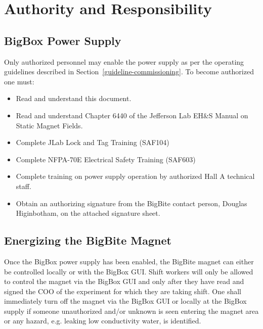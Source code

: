 \section{Authority and Responsibility}

\subsection{BigBox Power Supply}

Only authorized personnel may enable the power supply as per the operating
guidelines described in Section~\ref{guideline-commissioning}.  To become authorized one must:

\begin{itemize}

\item{Read and understand this document.}

\item{Read and understand Chapter 6440 of the Jefferson Lab EH\&S Manual on Static Magnet Fields.}

\item{Complete JLab Lock and Tag Training (SAF104)}

\item{Complete NFPA-70E Electrical Safety Training (SAF603)}

\item{Complete training on power supply operation by authorized Hall A technical staff.}

\item{Obtain an authorizing signature from the BigBite contact person, Douglas Higinbotham, on the
attached signature sheet.}

\end{itemize}

\subsection{Energizing the BigBite Magnet}

Once the BigBox power supply has been enabled, the BigBite magnet can either be
controlled locally or with the BigBox GUI.
Shift workers will only be allowed to control the magnet via the BigBox GUI and only after
they have read and signed the COO of the experiment for which they are taking shift.  
One shall immediately turn off the magnet via the BigBox GUI or locally at the BigBox supply 
if someone unauthorized and/or unknown is seen entering the magnet area or any hazard, e.g. leaking low conductivity water,
is identified.

